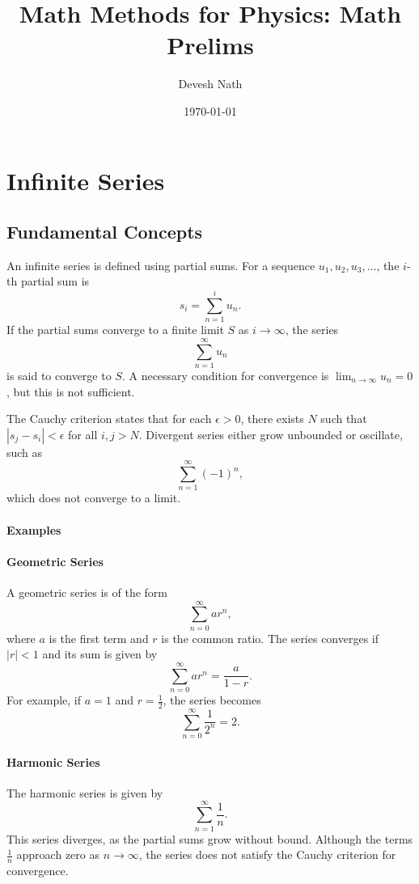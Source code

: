 \documentclass[12pt]{article}
\begin{document}
\title{Math Methods for Physics: Math Prelims}
\author{Devesh Nath}
\date{\today}

\maketitle

\section{Infinite Series}

\subsection{Fundamental Concepts}
An infinite series is defined using partial sums. For a sequence \(u_1, u_2, u_3, \dots\), the \(i\)-th partial sum is 
\[
s_i = \sum_{n=1}^i u_n.
\]
If the partial sums converge to a finite limit \(S\) as \(i \to \infty\), the series 
\[
\sum_{n=1}^\infty u_n
\]
is said to converge to \(S\). A necessary condition for convergence is \(\lim_{n \to \infty} u_n = 0\), but this is not sufficient. 

The Cauchy criterion states that for each \(\epsilon > 0\), there exists \(N\) such that \(|s_j - s_i| < \epsilon\) for all \(i, j > N\). Divergent series either grow unbounded or oscillate, such as 
\[
\sum_{n=1}^\infty (-1)^n,
\]
which does not converge to a limit.

\paragraph{Examples}

\paragraph{Geometric Series}
A geometric series is of the form 
\[
\sum_{n=0}^\infty ar^n,
\]
where \(a\) is the first term and \(r\) is the common ratio. The series converges if \(|r| < 1\) and its sum is given by
\[
\sum_{n=0}^\infty ar^n = \frac{a}{1-r}.
\]
For example, if \(a = 1\) and \(r = \frac{1}{2}\), the series becomes
\[
\sum_{n=0}^\infty \frac{1}{2^n} = 2.
\]

\paragraph{Harmonic Series}
The harmonic series is given by
\[
\sum_{n=1}^\infty \frac{1}{n}.
\]
This series diverges, as the partial sums grow without bound. Although the terms \(\frac{1}{n}\) approach zero as \(n \to \infty\), the series does not satisfy the Cauchy criterion for convergence.
\end{document}
